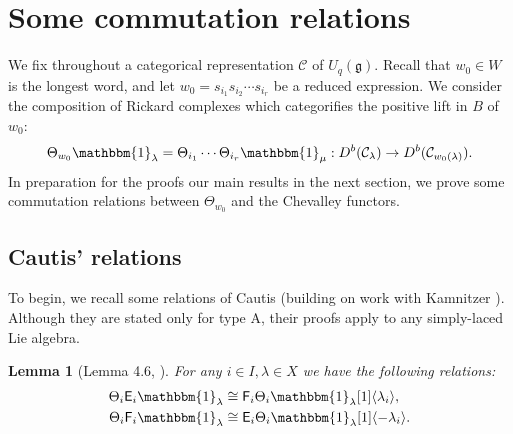 \documentclass[11pt,reqno]{amsart}
\numberwithin{equation}{section}
\newtheorem{Lemma}[equation]{Lemma}
\theoremstyle{definition}
\newtheorem{Remark}[equation]{Remark}
\theoremstyle{named}
\newcommand{\cC}{\mathcal{C}}
\newcommand{\sE}{\mathsf{E}}
\newcommand{\cF}{\mathcal{F}}
\newcommand{\sF}{\mathsf{F}}
\newcommand{\fg}{\mathfrak{g}}
\newcommand{\bone}{\mathbbm{1}}
\newcommand{\Hom}{\operatorname{Hom}}
\begin{document}
%
%


\section{Some commutation relations}\label{sec:commrels}
We fix throughout a categorical representation $\cC$ of  $U_q(\fg)$.
Recall that $w_0\in W$ is the longest word, and let $w_0=s_{i_1}s_{i_2} \cdots s_{i_r}$ be a reduced expression.
We consider the composition of Rickard complexes which categorifies the positive lift in $B$ of $w_0$:
$$
\Theta_{w_0}\bone_\lambda=\Theta_{i_1} \cdots \Theta_{i_r}\bone_\mu:D^b(\cC_\lambda) \to D^b(\cC_{w_0(\lambda)}).
$$
In preparation for the proofs our main results in the next section, we prove some commutation relations between $\Theta_{w_0}$ and the Chevalley functors.  


\subsection{Cautis' relations}
To begin, we recall some relations of Cautis (building on work with Kamnitzer \cite{CK3}).  Although they are stated only for type A,  their proofs apply to any simply-laced Lie algebra.

\begin{Lemma}[Lemma 4.6, \cite{Cauclasp}]\label{lem:Cau0}
For any $i\in I, \lambda \in X$ we have the following relations:
\begin{align*}
\Theta_i\sE_i\bone_\lambda &\cong \sF_i\Theta_i\bone_\lambda[1]\langle \lambda_i \rangle, 
\\
\Theta_i\sF_i\bone_\lambda &\cong \sE_i\Theta_i\bone_\lambda[1]\langle -\lambda_i \rangle. 
\end{align*}
\end{Lemma}
\end{document}
